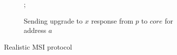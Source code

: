 \begin{figure}
\begin{subfigure}{\linewidth}
\begin{boxedminipage}{\linewidth}
\begin{algorithmic}
  \State \send{} ;
\EndProc
\end{algorithmic}
\end{boxedminipage}
\caption{Sending upgrade to $x$ response from $p$ to $core$ for address $a$}
\label{uResp}
\end{subfigure}

\caption{Realistic MSI protocol}
\label{realistic}
\end{figure}

